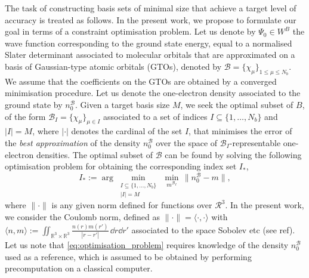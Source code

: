 \documentclass[a4paper,11pt]{article}
\begin{document}
The task of constructing basis sets of minimal size that achieve 
a target level of accuracy is treated as follows. In the present work, we propose to
formulate our goal in terms of a constraint optimisation problem. Let us denote
by $\Psi_0\in W^B$ the wave function corresponding to the ground state energy,
equal to a normalised Slater determinant associated to molecular orbitals that
are approximated on a basis of Gaussian-type atomic orbitals (GTOs), denoted by
$\mathcal B=\{\chi_{\mu}\}_{1\leq \mu\leq N_b}$. We assume 
that the coefficients on the GTOs are obtained by a converged minimisation
procedure. Let us denote the one-electron density associated to the ground state by
$n_0^{\mathcal B}$. Given a target basis size $M$, we seek the optimal subset
of $B$, of the form $\mathcal B_I=\{\chi_{\mu}\}_{\mu\in I}$ associated to a set of
indices $I\subseteq\{1,\ldots,N_b\}$ and $|I|=M$, where $|\cdot|$ denotes the 
cardinal of the set $I$, that minimises the error of the \textit{best
approximation} of the density $n_0^{\mathcal B}$ over the space of $\mathcal
B_I$-representable one-electron densities. The optimal subset
of $\mathcal B$ can be found by solving the following optimisation problem for
obtaining the corresponding index set $I_*$, 
\begin{equation}
    I_* := \arg\min_{\substack{I\subseteq\{1,\ldots,N_b\} \\ |I|=M}}\,
    \min_{m^{\mathcal B_I}}\,\|n_0^{\mathcal B} - m\|,
\end{equation}
where $\|\cdot\|$ is any given norm defined for functions over $\mathcal R^3$. 
In the present work, we consider the Coulomb norm, defined as
$\|\cdot\|=\langle\cdot,\cdot\rangle$ with
$\langle n,m\rangle:=\iint_{\mathbb R^3\times\mathbb R^3}\frac{n(r)m(r')}{|r -
r'|}\,\dd{r}\dd{r'}$ associated to the space Sobolev etc (see ref). Let us note
that \cref{eq:optimisation_problem} requires knowledge of the density
$n_0^{\mathcal B}$ used as a reference, which is assumed to be obtained by 
performing precomputation on a classical computer. 
\end{document}
